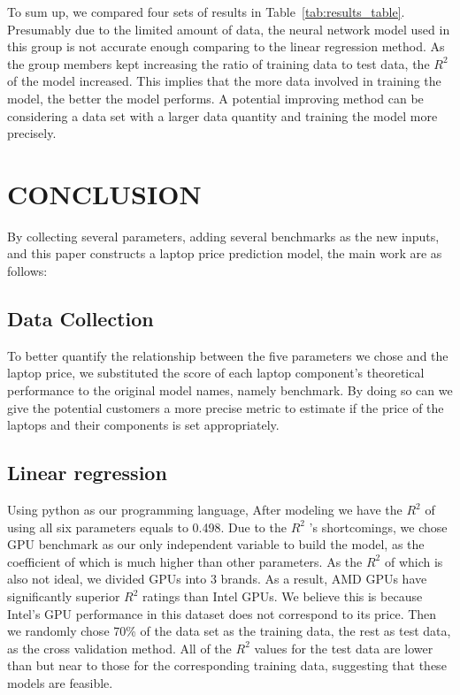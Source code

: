 \documentclass{scrartcl}
\begin{document}
\noindent To sum up, we compared four sets of results in Table~\ref{tab:results_table}. Presumably due to the limited amount of data, the neural network model used in this group is not accurate enough comparing to the linear regression method. As the group members kept increasing the ratio of training data to test data, the $R^2$ of the model increased. This implies that the more data involved in training the model, the better the model performs. A potential improving method can be considering a data set with a larger data quantity and training the model more precisely.\\




\section{CONCLUSION}




By collecting several parameters, adding several benchmarks as the new inputs, and this paper constructs a laptop price prediction model, the main work are as follows:\\

\subsection{Data Collection}
To better quantify the relationship between the five parameters we chose and the laptop price, we substituted the score of each laptop component’s theoretical performance to the original model names, namely benchmark. By doing so can we give the potential customers a more precise metric to estimate if the price of the laptops and their components is set appropriately.\\
\subsection{Linear regression }
Using python as our programming language, After modeling we have the $R^2$ of using all six parameters equals to 0.498. Due to the $R^2$ 's shortcomings, we chose GPU benchmark as our only independent variable to build the model, as the coefficient of which is much higher than other parameters. As the $R^2$ of which is also not ideal, we divided GPUs into 3 brands. As a result, AMD GPUs have significantly superior $R^2$ ratings than Intel GPUs. We believe this is because Intel's GPU performance in this dataset does not correspond to its price. Then we randomly chose 70\% of the data set as the training data, the rest as test data, as the cross validation method. All of the $R^2$ values for the test data are lower than but near to those for the corresponding training data, suggesting that these models are feasible.\\
\end{document}
